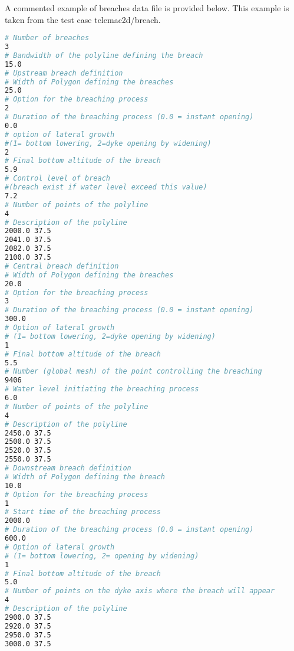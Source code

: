  A commented example of breaches data file is provided below. This example is taken from the test case telemac2d/breach.

\begin{lstlisting}[language=bash]
# Number of breaches
3
# Bandwidth of the polyline defining the breach
15.0
# Upstream breach definition
# Width of Polygon defining the breaches
25.0
# Option for the breaching process
2
# Duration of the breaching process (0.0 = instant opening)
0.0
# option of lateral growth
#(1= bottom lowering, 2=dyke opening by widening)
2
# Final bottom altitude of the breach
5.9
# Control level of breach 
#(breach exist if water level exceed this value)
7.2
# Number of points of the polyline
4
# Description of the polyline
2000.0 37.5
2041.0 37.5
2082.0 37.5
2100.0 37.5
# Central breach definition
# Width of Polygon defining the breaches
20.0
# Option for the breaching process
3
# Duration of the breaching process (0.0 = instant opening)
300.0
# Option of lateral growth
# (1= bottom lowering, 2=dyke opening by widening)
1
# Final bottom altitude of the breach
5.5
# Number (global mesh) of the point controlling the breaching
9406
# Water level initiating the breaching process
6.0
# Number of points of the polyline
4
# Description of the polyline
2450.0 37.5
2500.0 37.5
2520.0 37.5
2550.0 37.5
# Downstream breach definition
# Width of Polygon defining the breach
10.0
# Option for the breaching process
1
# Start time of the breaching process
2000.0
# Duration of the breaching process (0.0 = instant opening)
600.0
# Option of lateral growth
# (1= bottom lowering, 2= opening by widening)
1
# Final bottom altitude of the breach
5.0
# Number of points on the dyke axis where the breach will appear
4
# Description of the polyline
2900.0 37.5
2920.0 37.5
2950.0 37.5
3000.0 37.5
\end{lstlisting}
